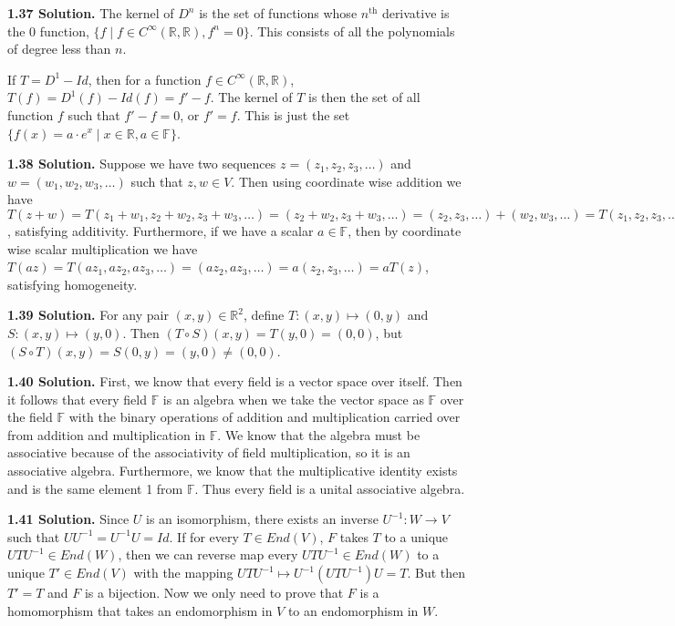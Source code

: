 \textbf{1.37 Solution.} The kernel of $D^n$ is the set of functions whose $n^{\text{th}}$ derivative is the 0 function, $\{f\mid f\in C^{\infty}(\mathbb{R},\mathbb{R}), f^n=0\}$. This consists of all the polynomials of degree less than $n$.

If $T=D^1-Id$, then for a function $f\in C^{\infty}(\mathbb{R},\mathbb{R})$, $T(f)=D^1(f)-Id(f)=f'-f$. The kernel of $T$ is then the set of all function $f$ such that $f'-f = 0$, or $f'=f$. This is just the set $\{f(x)=a\cdot e^x\mid x\in\mathbb{R},a\in\mathbb{F}\}$.

\textbf{1.38 Solution.} Suppose we have two sequences $z=(z_1,z_2,z_3,\ldots)$ and $w=(w_1,w_2,w_3,\ldots)$ such that $z,w\in V$. Then using coordinate wise addition we have $T(z+w)=T(z_1+w_1,z_2+w_2,z_3+w_3,\ldots)=(z_2+w_2,z_3+w_3,\ldots)=(z_2,z_3,\ldots)+(w_2,w_3,\ldots)=T(z_1,z_2,z_3,\ldots)+T(w_1,w_2,w_3,\ldots)=T(z)+T(w)$, satisfying additivity. Furthermore, if we have a scalar $a\in\mathbb{F}$, then by coordinate wise scalar multiplication we have $T(az)=T(az_1,az_2,az_3,\ldots)=(az_2,az_3,\ldots)=a(z_2,z_3,\ldots)=aT(z)$, satisfying homogeneity.

\textbf{1.39 Solution.} For any pair $(x,y)\in\mathbb{R}^2$, define $T:(x,y)\mapsto(0,y)$ and $S:(x,y)\mapsto(y,0)$. Then $(T\circ S)(x,y)=T(y,0)=(0,0)$, but $(S\circ T)(x,y)=S(0,y)=(y,0)\neq(0,0)$.

\textbf{1.40 Solution.} First, we know that every field is a vector space over itself. Then it follows that every field $\mathbb{F}$ is an algebra when we take the vector space as $\mathbb{F}$ over the field $\mathbb{F}$ with the binary operations of addition and multiplication carried over from addition and multiplication in $\mathbb{F}$. We know that the algebra must be associative because of the associativity of field multiplication, so it is an associative algebra. Furthermore, we know that the multiplicative identity exists and is the same element 1 from $\mathbb{F}$. Thus every field is a unital associative algebra.

\textbf{1.41 Solution.} Since $U$ is an isomorphism, there exists an inverse $U^{-1}:W\to V$ such that $UU^{-1}=U^{-1}U=Id$. If for every $T\in End(V)$, $F$ takes $T$ to a unique $UTU^{-1}\in End(W)$, then we can reverse map every $UTU^{-1}\in End(W)$ to a unique $T'\in End(V)$ with the mapping $UTU^{-1}\mapsto U^{-1}(UTU^{-1})U=T$. But then $T'=T$ and $F$ is a bijection. Now we only need to prove that $F$ is a homomorphism that takes an endomorphism in $V$ to an endomorphism in $W$.

